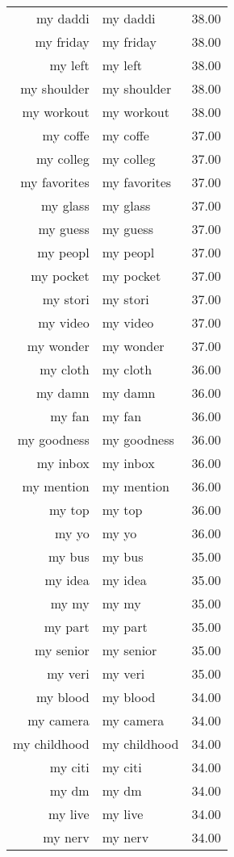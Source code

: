 \begin{table}[ht]
\begin{tabular}{rlr}
  my daddi & my daddi & 38.00 \\ 
  my friday & my friday & 38.00 \\ 
  my left & my left & 38.00 \\ 
  my shoulder & my shoulder & 38.00 \\ 
  my workout & my workout & 38.00 \\ 
  my coffe & my coffe & 37.00 \\ 
  my colleg & my colleg & 37.00 \\ 
  my favorites & my favorites & 37.00 \\ 
  my glass & my glass & 37.00 \\ 
  my guess & my guess & 37.00 \\ 
  my peopl & my peopl & 37.00 \\ 
  my pocket & my pocket & 37.00 \\ 
  my stori & my stori & 37.00 \\ 
  my video & my video & 37.00 \\ 
  my wonder & my wonder & 37.00 \\ 
  my cloth & my cloth & 36.00 \\ 
  my damn & my damn & 36.00 \\ 
  my fan & my fan & 36.00 \\ 
  my goodness & my goodness & 36.00 \\ 
  my inbox & my inbox & 36.00 \\ 
  my mention & my mention & 36.00 \\ 
  my top & my top & 36.00 \\ 
  my yo & my yo & 36.00 \\ 
  my bus & my bus & 35.00 \\ 
  my idea & my idea & 35.00 \\ 
  my my & my my & 35.00 \\ 
  my part & my part & 35.00 \\ 
  my senior & my senior & 35.00 \\ 
  my veri & my veri & 35.00 \\ 
  my blood & my blood & 34.00 \\ 
  my camera & my camera & 34.00 \\ 
  my childhood & my childhood & 34.00 \\ 
  my citi & my citi & 34.00 \\ 
  my dm & my dm & 34.00 \\ 
  my live & my live & 34.00 \\ 
  my nerv & my nerv & 34.00 \\ 

\end{tabular}
\end{table}
